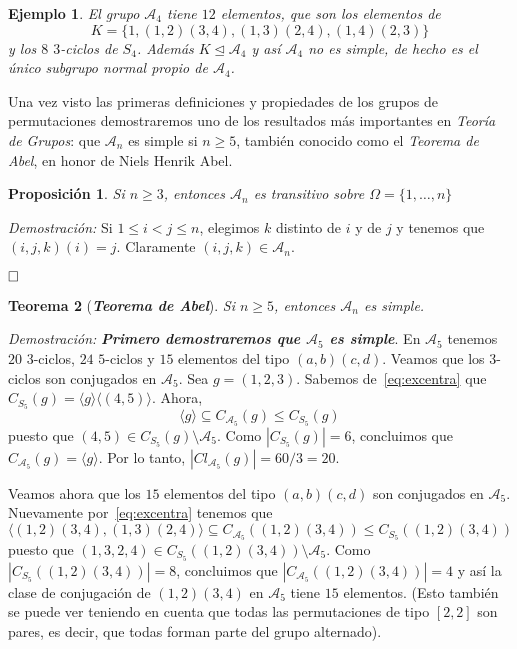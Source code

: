 \documentclass[12pt]{article}
\newtheorem{theorem}{Teorema}[section]
\newtheorem{proposition}[theorem]{Proposición}
\newtheorem{example}{Ejemplo}[theorem]
\begin{document}
\begin{example} El grupo $\mathcal{A}_{4}$ tiene $12$ elementos, que son los elementos de $$K = \lbrace 1,(1,2)(3,4),(1,3)(2,4),(1,4)(2,3) \rbrace$$ y los $8$ $3$-ciclos de $S_{4}$. Además $K \unlhd \mathcal{A}_{4}$ y así $\mathcal{A}_{4}$ no es simple, de hecho es el único subgrupo normal propio de $\mathcal{A}_{4}$.
\end{example}

Una vez visto las primeras definiciones y propiedades de los grupos de permutaciones demostraremos uno de los resultados más importantes en \textit{Teoría de Grupos}: que $\mathcal{A}_{n}$ es simple si $n \geq 5$, también conocido como el \textit{Teorema de Abel}, en honor de Niels Henrik Abel.

\begin{proposition}\label{eq:preabel} Si $n \geq 3$, entonces $\mathcal{A}_{n}$ es transitivo sobre $\Omega =\lbrace 1, \ldots, n \rbrace$
\end{proposition}
\emph{Demostración: } Si $1 \leq i <j \leq n$, elegimos $k$ distinto de $i$ y de $j$ y tenemos que $(i,j,k)(i) = j$. Claramente $(i,j,k) \in \mathcal{A}_{n}$.

$\hfill \square$

\begin{theorem}[\textbf{\textit{Teorema de Abel}}] Si $n \geq 5$, entonces $\mathcal{A}_{n}$ es simple.
\end{theorem}
\emph{Demostración: }\textbf{\textit{Primero demostraremos que $\mathcal{A}_{5}$ es simple}}. En $\mathcal{A}_{5}$ tenemos $20$ $3$-ciclos, $24$ $5$-ciclos y $15$ elementos del tipo $(a,b)(c,d)$. Veamos que los $3$-ciclos son conjugados en $\mathcal{A}_{5}$. Sea $g = (1,2,3)$. Sabemos de~\ref{eq:excentra} que $C_{S_{5}}(g)= \langle g\rangle \langle(4,5) \rangle$. Ahora, $$\langle g \rangle \subseteq C_{\mathcal{A}_{5}}(g) \leq C_{S_{5}}(g)$$ puesto que $(4,5) \in C_{S_{5}}(g) \setminus \mathcal{A}_{5}$. Como $|C_{S_{5}}(g)| = 6$, concluimos que $C_{\mathcal{A}_{5}}(g) = \langle g \rangle$. Por lo tanto, $|Cl_{\mathcal{A}_{5}}(g)| = 60/3 = 20.$ 

Veamos ahora que los $15$ elementos del tipo $(a,b)(c,d)$ son conjugados en $\mathcal{A}_{5}$. Nuevamente por~\ref{eq:excentra} tenemos que $$\langle (1,2)(3,4),(1,3)(2,4) \rangle \subseteq C_{\mathcal{A}_{5}}((1,2)(3,4)) \leq C_{S_{5}}((1,2)(3,4))$$ puesto que $(1,3,2,4) \in C_{S_{5}}((1,2)(3,4)) \setminus \mathcal{A}_{5}$. Como $|C_{S_{5}}((1,2)(3,4))| = 8$, concluimos que $|C_{\mathcal{A}_{5}}((1,2)(3,4))| = 4$ y así la clase de conjugación de $(1,2)(3,4)$ en $\mathcal{A}_{5}$ tiene $15$ elementos. (Esto también se puede ver teniendo en cuenta que todas las permutaciones de tipo $[2,2]$ son pares, es decir, que todas forman parte del grupo alternado).
\end{document}
